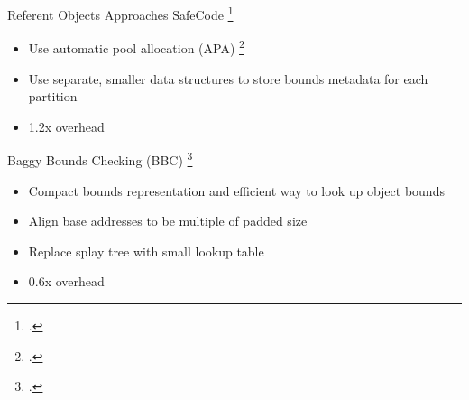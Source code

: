 \documentclass[aspectratio=169]{beamer}
\begin{document}
\begin{frame}[fragile]{Referent Objects Approaches}
SafeCode \footcite{dhurjati_backwards-compatible_2006}
    \begin{itemize}
        \item Use automatic pool allocation (APA) \footcite{lattner_automatic_2005} 
        \item Use separate, \alert{smaller} data structures to store bounds metadata for \alert{each partition}
        \item 1.2x overhead
    \end{itemize}

\pause

Baggy Bounds Checking (BBC) \footcite{akritidis_baggy_2009}
    \begin{itemize}
    \item Compact bounds representation and efficient way to look up object bounds
    \item Align base addresses to be multiple of padded size
    \item Replace splay tree with small lookup table
    \item 0.6x overhead 
    \end{itemize}
\vspace{0.2in}

\end{frame}
\end{document}

